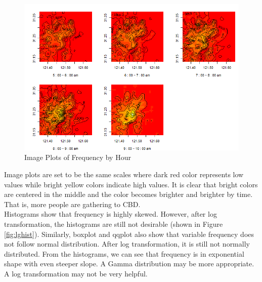 \documentclass[hidelinks,12pt]{article}
\begin{document}
	\begin{figure}[!ht]
		\includegraphics[width=\textwidth]{image.png}
		\caption{Image Plots of Frequency by Hour \label{fig:image}}
	\end{figure}
\FloatBarrier
Image plots are set to be the same scales where dark red color represents low values while bright yellow colors indicate high values. It is clear that bright colors are centered in the middle and the color becomes brighter and brighter by time. That is, more people are gathering to CBD.\\

	Histograms show that frequency is highly skewed. However, after log transformation, the histograms are still not desirable (shown in Figure \ref{fig:lghist}). Similarly, boxplot and qqplot also show that variable frequency does not follow normal distribution. After log transformation, it is still not normally distributed. From the histograms, we can see that frequency is in exponential shape with even steeper slope. A Gamma distribution may be more appropriate. A log transformation may not be very helpful.
\end{document}
